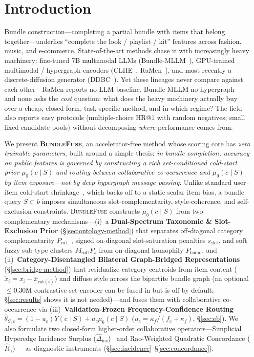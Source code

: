 \section{Introduction}
\label{sec:intro}
Bundle construction---completing a partial bundle with items that belong together---underlies ``complete the
look / playlist / kit'' features across fashion, music, and e-commerce. State-of-the-art methods chase it with
increasingly heavy machinery: fine-tuned 7B multimodal LLMs (Bundle-MLLM~\cite{bundlemllm}), GPU-trained
multimodal / hypergraph encoders (CLHE~\cite{clhe}, RaMen~\cite{ramen}), and most recently a discrete-diffusion
generator (DDBC~\cite{ddbc}). Yet these lineages never compare against each other---RaMen reports no LLM
baseline, Bundle-MLLM no hypergraph---and none asks the \emph{cost} question: what does the heavy machinery
actually buy over a cheap, closed-form, task-specific method, and in which regime? The field also reports easy
protocols (multiple-choice HR@1 with random negatives; small fixed candidate pools) without decomposing
\emph{where} performance comes from.

We present \textbf{\textsc{BundleFuse}}, an accelerator-free method whose scoring core has \emph{zero trainable
parameters}, built around a simple thesis: \emph{in bundle completion, accuracy on public features is governed by
constructing a rich set-conditioned cold-start prior $\mu_0(c\mid S)$ and routing between collaborative co-occurrence
and $\mu_0(c\mid S)$ by item exposure---not by deep hypergraph message passing}.
Unlike standard user--item cold-start shrinkage~\cite{bell2007,agarwal2009}, which backs off to a static scalar item
bias, a bundle query $S \subset b$ imposes simultaneous slot-complementarity, style-coherence, and self-exclusion
constraints. \textsc{BundleFuse} constructs $\mu_0(c\mid S)$ from two complementary mechanisms---(i)~a
\textbf{Dual-Spectrum Taxonomic \& Slot-Exclusion Prior} (\S\ref{sec:ontology-method}) that separates off-diagonal
category complementarity $P_{\text{cat}}$~\cite{mcauley}, signed on-diagonal slot-saturation penalties $s_{\text{slot}}$,
and soft fuzzy sub-type clusters $M_{\text{soft}}P_s$ from on-diagonal homophily $P_{\text{homo}}$, and (ii)~\textbf{Category-Disentangled
Bilateral Graph-Bridged Representations} (\S\ref{sec:bridge-method}) that residualize category centroids from item
content ($\tilde{x}_i = x_i - \bar{x}_{\text{cat}(i)}$) and diffuse style across the bipartite bundle graph (an
optional ${\le}0.30$M contrastive set-encoder can be fused in but is off by default; \S\ref{sec:results} shows it is
not needed)---and fuses them with collaborative co-occurrence via (iii)~\textbf{Validation-Frozen
Frequency-Confidence Routing} $\hat{\theta}_{S,c} = (1 - u_c)Y(c\mid S) + u_c\mu_0(c\mid S)$ ($u_c =
\kappa_f / (f_c + \kappa_f)$, \S\ref{sec:eb}). We also formulate two closed-form higher-order collaborative
operators---Simplicial Hyperedge Incidence Surplus ($\hat{\Delta}_{\text{inc}}$)~\cite{benson2018,lee2024} and
Rao-Weighted Quadratic Concordance ($\hat{R}_{\gamma}$)~\cite{rendle2010,blondel2016,rao1982}---as diagnostic
instruments (\S\ref{sec:incidence}--\S\ref{sec:concordance}).

